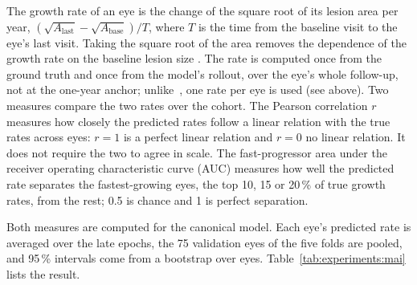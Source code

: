 The growth rate of an eye is the change of the square root of its lesion
area per year, $(\sqrt{A_{\text{last}}} - \sqrt{A_{\text{base}}}) / T$,
where $T$ is the time from the baseline visit to the eye's last visit.
Taking the square root of the area removes the dependence of the growth
rate on the baseline lesion size \citep{Feuer2013}. The rate is computed
once from the ground truth and once from the model's rollout, over the
eye's whole follow-up, not at the one-year anchor; unlike~\citet{Mai2024},
one rate per eye is used (see above).
Two measures compare the two rates over the cohort. The Pearson
correlation $r$ measures how closely the predicted rates follow a linear
relation with the true rates across eyes: $r = 1$ is a perfect linear
relation and $r = 0$ no linear relation. It does not require the two to
agree in scale. The fast-progressor area under the receiver operating
characteristic curve (AUC) measures how well the predicted rate separates
the fastest-growing eyes, the top 10, 15 or 20\,\% of true growth rates,
from the rest; 0.5 is chance and 1 is perfect separation.

Both measures are computed for the canonical model. Each eye's predicted
rate is averaged over the late epochs, the 75 validation eyes of the five
folds are pooled, and 95\,\% intervals come from a bootstrap over eyes.
Table~\ref{tab:experiments:mai} lists the result.

